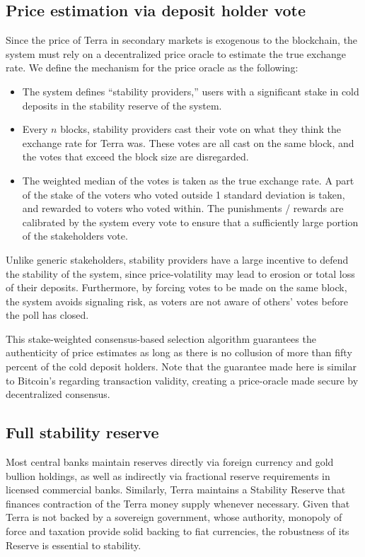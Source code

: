 \documentclass{article}
\begin{document}
\subsection{Price estimation via deposit holder vote}

Since the price of Terra in secondary markets is exogenous to the blockchain, the system must rely on a decentralized price oracle to estimate the true exchange rate. We define the mechanism for the price oracle as the following: 

\begin{itemize}

    \item The system defines “stability providers,” users with a significant stake in cold deposits in the stability reserve of the system.
    \item Every $n$ blocks, stability providers cast their vote on what they think the exchange rate for Terra was. These votes are all cast on the same block, and the votes that exceed the block size are disregarded. 
    \item The weighted median of the votes is taken as the true exchange rate. A part of the stake of the voters who voted outside 1 standard deviation is taken, and rewarded to voters who voted within. The punishments / rewards are calibrated by the system every vote to ensure that a sufficiently large portion of the stakeholders vote.
\end{itemize}

Unlike generic stakeholders, stability providers have a large incentive to defend the stability of the system, since price-volatility may lead to erosion or total loss of their deposits. Furthermore, by forcing votes to be made on the same block, the system avoids signaling risk, as voters are not aware of others' votes before the poll has closed. 

This stake-weighted consensus-based selection algorithm guarantees the authenticity of price estimates as long as there is no collusion of more than fifty percent of the cold deposit holders. Note that the guarantee made here is similar to Bitcoin's regarding transaction validity, creating a price-oracle made secure by decentralized consensus. 


\subsection{Full stability reserve}

Most central banks maintain reserves directly via foreign currency and gold bullion holdings, as well as indirectly via fractional reserve requirements in licensed commercial banks. Similarly, Terra maintains a Stability Reserve that finances contraction of the Terra money supply whenever necessary. Given that Terra is not backed by a sovereign government, whose authority, monopoly of force and taxation provide solid backing to fiat currencies, the robustness of its Reserve is essential to stability. 
\end{document}
